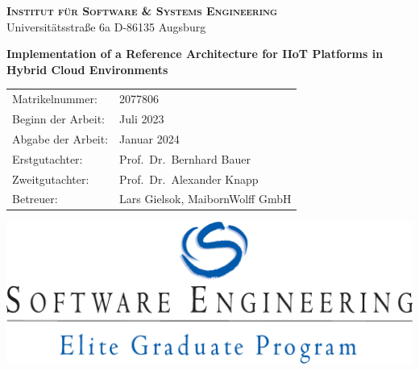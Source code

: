 \vspace{1cm}
\begin{center}
{\Large
{\bfseries \scshape Institut für Software \& Systems Engineering}\\
Universitätsstraße 6a \hspace{0.25cm} D-86135 Augsburg\\
}
\end{center}

\vspace{1.0cm}
\begin{center}
{\Huge \bfseries Implementation of a Reference Architecture for IIoT Platforms in Hybrid Cloud Environments \\ }

\end{center}

\vspace{1.0cm}
\begin{center}
\begin{table}[htbp]
\centering
\begin{tabular}{ll}
Matrikelnummer: & 2077806 \\
Beginn der Arbeit: & Juli 2023 \\ 
Abgabe der Arbeit: & Januar 2024 \\
Erstgutachter: & Prof.\ Dr.\ Bernhard Bauer \\
Zweitgutachter: & Prof.\ Dr.\ Alexander Knapp \\
Betreuer: & Lars Gielsok, MaibornWolff GmbH \\
\end{tabular}
\end{table}
\end{center}

\vspace{1.0cm}
\begin{center}
\includegraphics[width=.4\linewidth]{img/logos/LogoSEengl}
\end{center}

